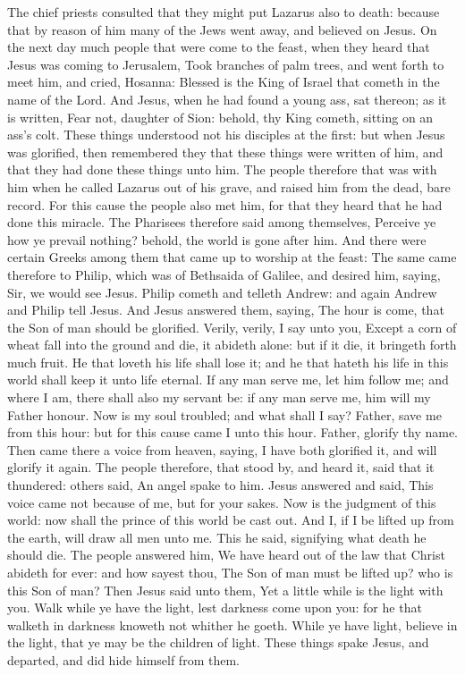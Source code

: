  The chief priests consulted that they might put Lazarus also to death: because that by reason of him many of the Jews went away, and believed on Jesus. On the next day much people that were come to the feast, when they heard that Jesus was coming to Jerusalem, Took branches of palm trees, and went forth to meet him, and cried, Hosanna: Blessed is the King of Israel that cometh in the name of the Lord. And Jesus, when he had found a young ass, sat thereon; as it is written, Fear not, daughter of Sion: behold, thy King cometh, sitting on an ass's colt. These things understood not his disciples at the first: but when Jesus was glorified, then remembered they that these things were written of him, and that they had done these things unto him. The people therefore that was with him when he called Lazarus out of his grave, and raised him from the dead, bare record. For this cause the people also met him, for that they heard that he had done this miracle. The Pharisees therefore said among themselves, Perceive ye how ye prevail nothing? behold, the world is gone after him. And there were certain Greeks among them that came up to worship at the feast: The same came therefore to Philip, which was of Bethsaida of Galilee, and desired him, saying, Sir, we would see Jesus. Philip cometh and telleth Andrew: and again Andrew and Philip tell Jesus. And Jesus answered them, saying, The hour is come, that the Son of man should be glorified. Verily, verily, I say unto you, Except a corn of wheat fall into the ground and die, it abideth alone: but if it die, it bringeth forth much fruit. He that loveth his life shall lose it; and he that hateth his life in this world shall keep it unto life eternal. If any man serve me, let him follow me; and where I am, there shall also my servant be: if any man serve me, him will my Father honour. Now is my soul troubled; and what shall I say? Father, save me from this hour: but for this cause came I unto this hour. Father, glorify thy name. Then came there a voice from heaven, saying, I have both glorified it, and will glorify it again. The people therefore, that stood by, and heard it, said that it thundered: others said, An angel spake to him. Jesus answered and said, This voice came not because of me, but for your sakes. Now is the judgment of this world: now shall the prince of this world be cast out. And I, if I be lifted up from the earth, will draw all men unto me. This he said, signifying what death he should die. The people answered him, We have heard out of the law that Christ abideth for ever: and how sayest thou, The Son of man must be lifted up? who is this Son of man? Then Jesus said unto them, Yet a little while is the light with you. Walk while ye have the light, lest darkness come upon you: for he that walketh in darkness knoweth not whither he goeth. While ye have light, believe in the light, that ye may be the children of light. These things spake Jesus, and departed, and did hide himself from them.

